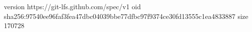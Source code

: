 version https://git-lfs.github.com/spec/v1
oid sha256:97540ee96faf3fea47dbc04039bbe77dfbc97f9374ce30fd13555c1ea4833887
size 170728
